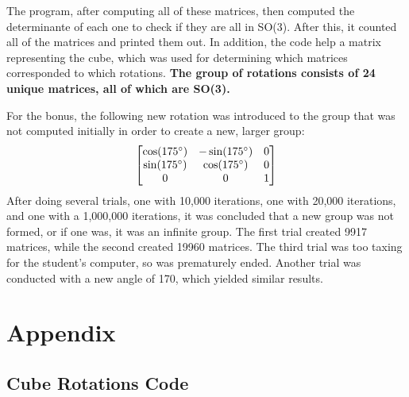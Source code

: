 \documentclass{article}
\newcommand{\code}[2]{
    \hrulefill
    \subsection*{#1}
    
    \vspace{2em}
}
\begin{document}
The program, after computing all of these matrices, then computed the determinante of each one to check if they are all in SO(3).
After this, it counted all of the matrices and printed them out.
In addition, the code help a matrix representing the cube, which was used for determining which matrices corresponded to which rotations.
\textbf{The group of rotations consists of 24 unique matrices, all of which are SO(3).}

For the bonus, the following new rotation was introduced to the group that was not computed initially in order to create a new, larger group:
\[
\begin{bmatrix}
\cos(175\degree) & -\sin(175\degree) & 0\\
\sin(175\degree) & \cos(175\degree) & 0\\
0 & 0 & 1
\end{bmatrix}
\]
After doing several trials, one with 10,000 iterations, one with 20,000 iterations, and one with a 1,000,000 iterations, it was concluded that a new group was not formed,
or if one was, it was an infinite group.
The first trial created 9917 matrices, while the second created 19960 matrices.
The third trial was too taxing for the student's computer, so was prematurely ended. 
Another trial was conducted with a new angle of 170\degree, which yielded similar results.

\clearpage

\section*{Appendix}

\code{Cube Rotations Code}{rotation.py}
\end{document}
